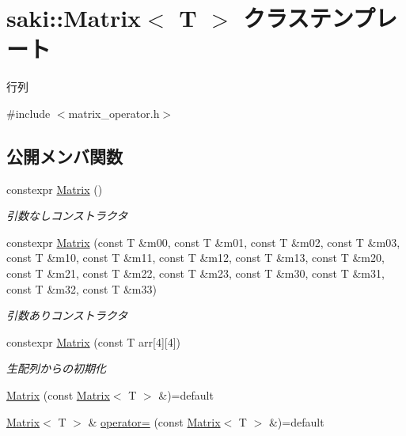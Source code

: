 \hypertarget{classsaki_1_1_matrix}{}\section{saki\+:\+:Matrix$<$ T $>$ クラステンプレート}
\label{classsaki_1_1_matrix}


行列  




{\ttfamily \#include $<$matrix\+\_\+operator.\+h$>$}

\subsection*{公開メンバ関数}
\begin{DoxyCompactItemize}
\item 
constexpr \mbox{\hyperlink{classsaki_1_1_matrix_a820035e9bafc0fa4269c4b94b1ec4f4f}{Matrix}} ()
\begin{DoxyCompactList}\small\item\em 引数なしコンストラクタ \end{DoxyCompactList}\item 
constexpr \mbox{\hyperlink{classsaki_1_1_matrix_ad4f497bd4ba2b7de464afea4436d9a51}{Matrix}} (const T \&m00, const T \&m01, const T \&m02, const T \&m03, const T \&m10, const T \&m11, const T \&m12, const T \&m13, const T \&m20, const T \&m21, const T \&m22, const T \&m23, const T \&m30, const T \&m31, const T \&m32, const T \&m33)
\begin{DoxyCompactList}\small\item\em 引数ありコンストラクタ \end{DoxyCompactList}\item 
constexpr \mbox{\hyperlink{classsaki_1_1_matrix_a945fec9cbcb1b175ac993db6a5c0cbd8}{Matrix}} (const T arr\mbox{[}4\mbox{]}\mbox{[}4\mbox{]})
\begin{DoxyCompactList}\small\item\em 生配列からの初期化 \end{DoxyCompactList}\item 
\mbox{\hyperlink{classsaki_1_1_matrix_a08d28bd14af9be6650325574a20101d7}{Matrix}} (const \mbox{\hyperlink{classsaki_1_1_matrix}{Matrix}}$<$ T $>$ \&)=default
\item 
\mbox{\hyperlink{classsaki_1_1_matrix}{Matrix}}$<$ T $>$ \& \mbox{\hyperlink{classsaki_1_1_matrix_af83ebe0a4f4652fbf30dd64307021603}{operator=}} (const \mbox{\hyperlink{classsaki_1_1_matrix}{Matrix}}$<$ T $>$ \&)=default

\end{DoxyCompactItemize}
